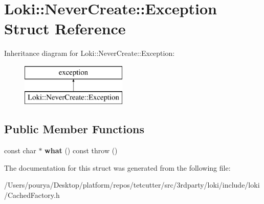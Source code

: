 \hypertarget{structLoki_1_1NeverCreate_1_1Exception}{}\section{Loki\+:\+:Never\+Create\+:\+:Exception Struct Reference}
\label{structLoki_1_1NeverCreate_1_1Exception}
Inheritance diagram for Loki\+:\+:Never\+Create\+:\+:Exception\+:\begin{figure}[H]
\begin{center}
\leavevmode
\includegraphics[height=2.000000cm]{structLoki_1_1NeverCreate_1_1Exception}
\end{center}
\end{figure}
\subsection*{Public Member Functions}
\begin{DoxyCompactItemize}
\item 
\hypertarget{structLoki_1_1NeverCreate_1_1Exception_abbfc809de272b903fed25e39b6fba66a}{}const char $\ast$ {\bfseries what} () const   throw ()\label{structLoki_1_1NeverCreate_1_1Exception_abbfc809de272b903fed25e39b6fba66a}

\end{DoxyCompactItemize}


The documentation for this struct was generated from the following file\+:\begin{DoxyCompactItemize}
\item 
/\+Users/pourya/\+Desktop/platform/repos/tetcutter/src/3rdparty/loki/include/loki/Cached\+Factory.\+h\end{DoxyCompactItemize}
